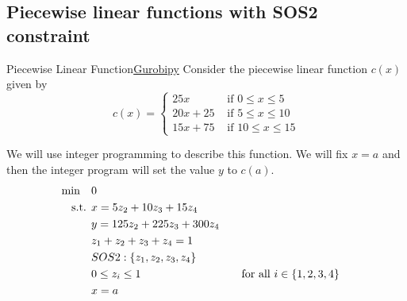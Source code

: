 \subsection{Piecewise linear functions with SOS2 constraint}
\label{subsec:pwl-sos2}
\begin{examplewithcode}{Piecewise Linear Function}{\href{https://github.com/open-optimization/open-optimization-or-examples/blob/master/nonlinear-programming/Gurobi-SOS-Examples.ipynb}{Gurobipy}}
\label{example:pwl}
Consider the piecewise linear function 
 $c(x)$ given by
$$
c(x) = 
\begin{cases}
25x  & \text{ if } 0 \leq x \leq 5\\
20x + 25 & \text{ if } 5 \leq x \leq 10\\
15x + 75 & \text{ if } 10 \leq x \leq 15
\end{cases}
$$
\begin{center}
\par{}\label{fig:pwl-plot}%

\end{center}

We will use integer programming to describe this function.  We will fix $x = a$ and then the integer program will set the value $y$ to $c(a)$.
\begin{align*}
\min \quad & 0 \\
\mbox{ s.t. }        & x = 5 z_{2} +10 z_{3} + 15 z_{4} \\
 & y = 125 z_{2} + 225 z_{3} + 300 z_{4} \\
 & z_{1} + z_{2} + z_{3} + z_{4} = 1 \\
 & SOS2: \{z_1, z_2, z_3, z_4\} \\
 & 0 \leq z_{i} \leq 1 &&\quad \mbox{for all } i \in \{1,2,3,4\} \\
 & x = a \\
\end{align*}

\end{examplewithcode}

